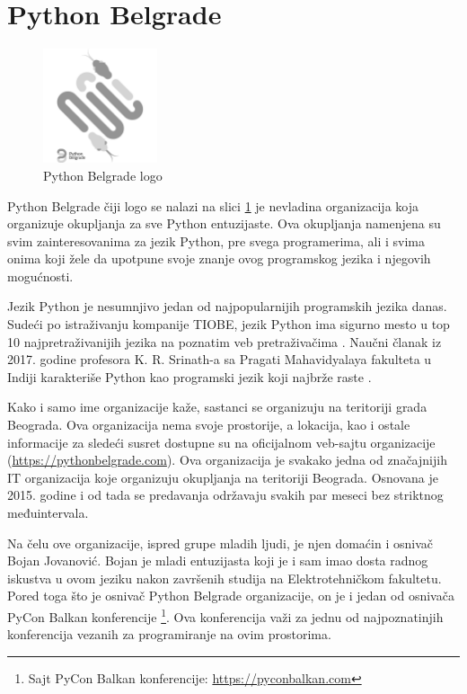 \documentclass[a4paper]{article}
\begin{document}
{\section{Python Belgrade}
\label{sec:pybgd}

\begin{figure}[H]
  \centering
  \includegraphics[width=0.3\textwidth]{pybgd.png}
  \caption{Python Belgrade logo}
  \label{fig:Pythonlogo}
\end{figure}

Python Belgrade čiji logo se nalazi na slici \ref{fig:Pythonlogo} je nevladina organizacija koja organizuje okupljanja za sve Python entuzijaste. Ova okupljanja namenjena su svim
zainteresovanima za jezik Python, pre svega programerima, ali i svima onima koji žele da upotpune svoje znanje ovog programskog jezika i njegovih mogućnosti.

Jezik Python je nesumnjivo jedan od najpopularnijih programskih jezika danas. Sudeći po istraživanju kompanije TIOBE, jezik Python ima sigurno mesto u top 10 najpretraživanijih jezika na poznatim veb pretraživačima \cite{pythonPopular}. Naučni članak iz 2017. godine profesora K. R. Srinath-a sa Pragati Mahavidyalaya fakulteta u Indiji karakteriše Python kao programski jezik koji najbrže raste \cite{pythonFastGrow}.

Kako i samo ime organizacije kaže, sastanci se organizuju na teritoriji grada Beograda. Ova organizacija nema svoje prostorije, a lokacija, kao i ostale informacije
za sledeći susret dostupne su na oficijalnom veb-sajtu organizacije (\url{https://pythonbelgrade.com}). Ova organizacija je svakako jedna od značajnijih IT organizacija koje organizuju okupljanja na teritoriji Beograda. Osnovana je 2015. godine i od tada se predavanja održavaju svakih par meseci bez striktnog međuintervala. 

Na čelu ove organizacije, ispred grupe mladih ljudi, je njen domaćin i osnivač Bojan Jovanović. Bojan je mladi entuzijasta koji je i sam imao dosta radnog iskustva u ovom jeziku nakon završenih studija na
Elektrotehničkom fakultetu. Pored toga što je osnivač Python Belgrade organizacije, on je i jedan od osnivača PyCon Balkan konferencije \footnote{Sajt PyCon Balkan konferencije: \url{https://pyconbalkan.com}}. Ova konferencija važi za jednu od najpoznatinjih konferencija vezanih za programiranje na ovim prostorima.

}
\end{document}
